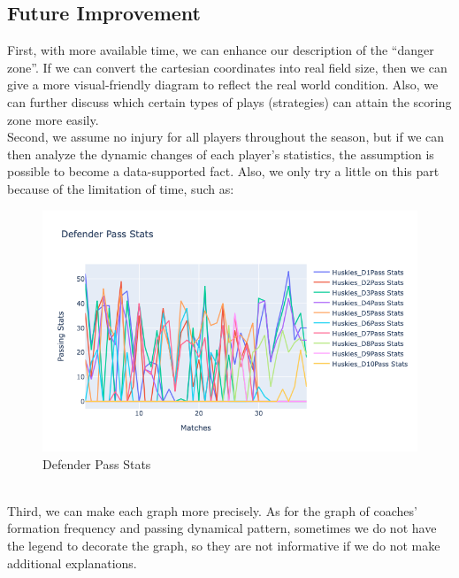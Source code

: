 \documentclass[12pt]{article}
\begin{document}
\subsection{Future Improvement}
First, with more available time, we can enhance our description of the “danger zone”. If we can convert the cartesian coordinates into real field size, then we can give a more visual-friendly diagram to reflect the real world condition. Also, we can further discuss which certain types of plays (strategies) can attain the scoring zone more easily. \\
\newline
Second, we assume no injury for all players throughout the season, but if we can then analyze the dynamic changes of each player’s statistics, the assumption is possible to become a data-supported fact. Also, we only try a little on this part because of the limitation of time, such as:
\begin{figure}[ht]
\begin{center}
\includegraphics[scale=0.5]{images/D.png}
\caption{Defender Pass Stats}
\end{center}
\end{figure}
\\
\newpage
Third, we can make each graph more precisely. As for the graph of coaches’ formation frequency and passing dynamical pattern, sometimes we do not have the legend to decorate the graph, so they are not informative if we do not make additional explanations. 
\end{document}
